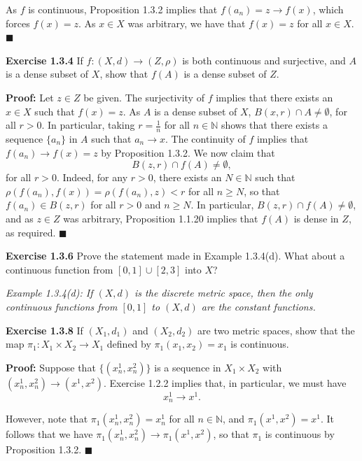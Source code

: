 \documentclass{article}
\begin{document}
As $f$ is continuous, Proposition 1.3.2 implies that $f(a_n)=z\to f(x)$, which forces $f(x)=z$. As $x\in X$ was arbitrary, we have that $f(x)=z$ for all $x\in X$. $\blacksquare$
\begin{tcolorbox}
\textbf{Exercise 1.3.4} If $f:(X,d)\to (Z,\rho)$ is both continuous and surjective, and $A$ is a dense subset of $X$, show that $f(A)$ is a dense subset of $Z$. 
\end{tcolorbox}
\textbf{Proof:} Let $z\in Z$ be given. The surjectivity of $f$ implies that there exists an\\
$x\in X$ such that $f(x)=z$. As $A$ is a dense subset of $X$, $B(x,r)\cap A\neq \emptyset$, for all $r>0$. In particular, taking $r=\frac{1}{n}$ for all $n\in \mathbb{N}$ shows that there exists a sequence $\{a_n\}$ in $A$ such that $a_n\to x$. The continuity of $f$ implies that $f(a_n)\to f(x)=z$ by Proposition 1.3.2. We now claim that \begin{equation*}B(z,r)\cap f(A)\neq \emptyset,\end{equation*}
for all $r>0$. Indeed, for any $r>0$, there exists an $N\in \mathbb{N}$ such that $\rho(f(a_n),f(x))=\rho (f(a_n),z)<r$ for all $n\geq N$, so that $f(a_n)\in B(z,r)$ for all $r>0$ and $n\geq N$. In particular, $B(z,r)\cap f(A)\neq \emptyset$, and as $z\in Z$ was arbitrary, Proposition 1.1.20 implies that $f(A)$ is dense in $Z$, as required. $\blacksquare$
\begin{tcolorbox}
\textbf{Exercise 1.3.6} Prove the statement made in Example 1.3.4(d). What about a continuous function from $[0,1]\cup [2,3]$ into $X$?
\end{tcolorbox}
\textit{Example 1.3.4(d): If $(X,d)$ is the discrete metric space, then the only continuous functions from $[0,1]$ to $(X,d)$ are the constant functions.}

\newpage
\begin{tcolorbox}
\textbf{Exercise 1.3.8} If $(X_1,d_1)$ and $(X_2,d_2)$ are two metric spaces, show that the map $\pi_1:X_1\times X_2 \to X_1$ defined by $\pi_1(x_1,x_2)=x_1$ is continuous.
\end{tcolorbox}

\textbf{Proof:} Suppose that $\{(x_n^1,x_n^2)\}$ is a sequence in $X_1\times X_2$ with\\
$(x_n^1,x_n^2)\to (x^1,x^2)$. Exercise 1.2.2 implies that, in particular, we must have \begin{equation*}x_n^1\to x^1.\end{equation*}

However, note that $\pi_1 \left(x_n^1,x_n^2\right)=x_n^1$ for all $n\in \mathbb{N}$, and $\pi_1(x^1,x^2)=x^1$. It follows that we have $\pi_1 \left(x_n^1,x_n^2\right)\to\pi_1(x^1,x^2) $, so that $\pi_1$ is continuous by Proposition 1.3.2. $\blacksquare$
\end{document}
